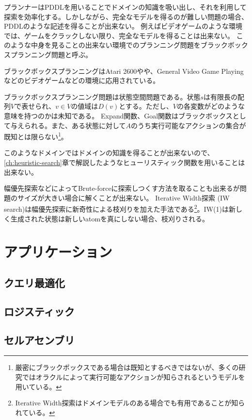 \documentclass{report}
\begin{document}
プランナーはPDDLを用いることでドメインの知識を吸い出し、それを利用して探索を効率化する。しかしながら、完全なモデルを得るのが難しい問題の場合、PDDLのような記述を得ることが出来ない。
例えばビデオゲームのような環境では、ゲームをクラックしない限り、完全なモデルを得ることは出来ない。
このような中身を見ることの出来ない環境でのプランニング問題をブラックボックスプランニング問題と呼ぶ。

ブラックボックスプランニングはAtari 2600や\cite{lipovetzky2015a}や、General Video Game Playing \cite{geffner2015}などのビデオゲームなどの環境に応用されている。

ブラックボックスプランニング問題は状態空間問題である。状態$s$は有限長の配列$V$で表せられ、$v \in V$の値域は$D(v)$とする。ただし、$V$の各変数がどのような意味を持つのかは未知である。
Expand関数、Goal関数はブラックボックスとして与えられる。また、ある状態に対して$A$のうち実行可能なアクションの集合が既知とは限らない\footnote{厳密にブラックボックスである場合は既知とするべきではないが、多くの研究ではオラクルによって実行可能なアクションが知らされるというモデルを用いている。}。

このようなドメインではドメインの知識を得ることが出来ないので、\ref{ch:heuristic-search}章で解説したようなヒューリスティック関数を用いることは出来ない。

幅優先探索などによってBrute-forceに探索しつくす方法を取ることも出来るが問題のサイズが大きい場合に解くことが出来ない\cite{Bellemare2013}。
Iterative Width探索 (IW search)\cite{lipovetzky2015a}は幅優先探索に新奇性による枝刈りを加えた手法である\footnote{Iterative Width探索はドメインモデルのある場合でも有用であることが知られている\cite{lipovetzkyg12}。}。IW(1)は新しく生成された状態は新しいatomを真にしない場合、枝刈りされる。


\section{アプリケーション}

\subsection{クエリ最適化}

\subsection{ロジスティック}

\subsection{セルアセンブリ}
\end{document}
